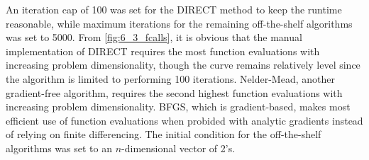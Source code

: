 \documentclass{article}
\begin{document}
An iteration cap of 100 was set for the DIRECT method to keep the runtime reasonable, while maximum iterations for the remaining off-the-shelf algorithms was set to 5000. From \autoref{fig:6_3_fcalls}, it is obvious that the manual implementation of DIRECT requires the most function evaluations with increasing problem dimensionality, though the curve remains relatively level since the algorithm is limited to performing 100 iterations. Nelder-Mead, another gradient-free algorithm, requires the second highest function evaluations with increasing problem dimensionality. BFGS, which is gradient-based, makes most efficient use of function evaluations when probided with analytic gradients instead of relying on finite differencing. The initial condition for the off-the-shelf algorithms was set to an $n$-dimensional vector of 2's. 

\end{document}
